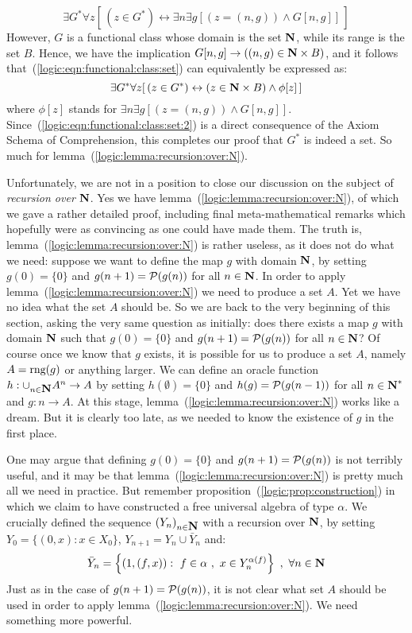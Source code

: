     \begin{equation}\label{logic:eqn:functional:class:set}
    \exists G^{*}\forall z[\,(z\in G^{*})\leftrightarrow\exists n\exists g[(z=(n,g))\land G[n,g]]\,]
    \end{equation}
However, $G$ is a functional class whose domain is the set $\mbox{$\bf N$}$,
while its range is the set $B$. Hence, we have the implication
$G[n,g]\to((n,g)\in\mbox{$\bf N$}\times B)$, and it follows
that~(\ref{logic:eqn:functional:class:set}) can equivalently be
expressed as:
    \begin{equation}\label{logic:eqn:functional:class:set:2}
     \exists G^{*}\forall z[\,(z\in G^{*})\leftrightarrow(z\in \mbox{$\bf N$}\times B)\land \phi[z]\,]
    \end{equation}
where $\phi[z]$ stands for $\exists n\exists g[(z=(n,g))\land
G[n,g]]$. Since~(\ref{logic:eqn:functional:class:set:2}) is a direct
consequence of the Axiom Schema of Comprehension, this completes our
proof that $G^{*}$ is indeed a set. So much for
lemma~(\ref{logic:lemma:recursion:over:N}).

Unfortunately, we are not in a position to close  our discussion on
the subject of {\em recursion over $\mbox{$\bf N$}$}. Yes we have
lemma~(\ref{logic:lemma:recursion:over:N}), of which we gave a
rather detailed proof, including final meta-mathematical remarks
which hopefully were as convincing as one could have made them. The
truth is, lemma~(\ref{logic:lemma:recursion:over:N}) is rather
useless, as it does not do what we need: suppose we want to define
the map $g$ with domain $\mbox{$\bf N$}$, by setting $g(0)=\{0\}$ and
$g(n+1)={\cal P}(g(n))$ for all $n\in\mbox{$\bf N$}$. In order to apply
lemma~(\ref{logic:lemma:recursion:over:N}) we need to produce a set
$A$. Yet we have no idea what the set $A$ should be. So we are back
to the very beginning of this section, asking the very same question
as initially: does there exists a map $g$ with domain $\mbox{$\bf N$}$ such that
$g(0)=\{0\}$ and $g(n+1)={\cal P}(g(n))$ for all $n\in\mbox{$\bf N$}$? Of course
once we know that $g$ exists, it is possible for us to produce a set
$A$, namely $A=\mbox{\rm rng}(g)$ or anything larger. We can define an oracle
function $h:\cup_{n\in\mbox{$\bf N$}}A^{n}\to A$ by setting $h(\emptyset)=\{0\}$
and $h(g)={\cal P}(g(n-1))$ for all $n\in\mbox{$\bf N$}^{*}$ and $g:n\to A$. At
this stage, lemma~(\ref{logic:lemma:recursion:over:N}) works like a
dream. But it is clearly too late, as we needed to know the
existence of $g$ in the first place.

One may argue that defining $g(0)=\{0\}$ and $g(n+1)={\cal P}(g(n))$
is not terribly useful, and it may be that
lemma~(\ref{logic:lemma:recursion:over:N}) is pretty much all we
need in practice. But remember
proposition~(\ref{logic:prop:construction}) in which we claim to
have constructed a free universal algebra of type $\alpha$. We
crucially defined the sequence $(Y_{n})_{n\in\mbox{$\bf N$}}$ with a recursion
over $\mbox{$\bf N$}$, by setting $Y_{0}=\{(0,x):x\in X_{0}\}$,
$Y_{n+1}=Y_{n}\cup\bar{Y}_{n}$ and:
    \[
    \bar{Y}_{n}=\left\{(1,(f,x)):\ f\in\alpha\ ,\ x\in Y_{n}^{\alpha(f)}\right\}\ ,\ \forall n\in\N
    \]
Just as in the case of $g(n+1)={\cal P}(g(n))$, it is not clear what
set $A$ should be used in order to apply
lemma~(\ref{logic:lemma:recursion:over:N}). We need something more
powerful.

